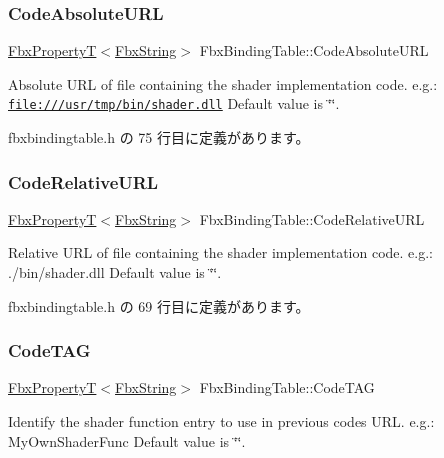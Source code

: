 \subsubsection{\texorpdfstring{Code\+Absolute\+U\+RL}{CodeAbsoluteURL}}
{\footnotesize\ttfamily \hyperlink{class_fbx_property_t}{Fbx\+PropertyT}$<$\hyperlink{class_fbx_string}{Fbx\+String}$>$ Fbx\+Binding\+Table\+::\+Code\+Absolute\+U\+RL}

Absolute U\+RL of file containing the shader implementation code. e.\+g.\+: \href{file:///usr/tmp/bin/shader.dll}{\tt file\+:///usr/tmp/bin/shader.\+dll} Default value is \char`\"{}\char`\"{}. 

 fbxbindingtable.\+h の 75 行目に定義があります。

\mbox{\label{class_fbx_binding_table_add10ea889f7b9e37ca0fbbf27dfc140f}} 
\subsubsection{\texorpdfstring{Code\+Relative\+U\+RL}{CodeRelativeURL}}
{\footnotesize\ttfamily \hyperlink{class_fbx_property_t}{Fbx\+PropertyT}$<$\hyperlink{class_fbx_string}{Fbx\+String}$>$ Fbx\+Binding\+Table\+::\+Code\+Relative\+U\+RL}

Relative U\+RL of file containing the shader implementation code. e.\+g.\+: ./bin/shader.dll Default value is \char`\"{}\char`\"{}. 

 fbxbindingtable.\+h の 69 行目に定義があります。

\mbox{\label{class_fbx_binding_table_ac1c73d117768ad0373d277a81e021fa3}} 
\subsubsection{\texorpdfstring{Code\+T\+AG}{CodeTAG}}
{\footnotesize\ttfamily \hyperlink{class_fbx_property_t}{Fbx\+PropertyT}$<$\hyperlink{class_fbx_string}{Fbx\+String}$>$ Fbx\+Binding\+Table\+::\+Code\+T\+AG}

Identify the shader function entry to use in previous code\textquotesingle{}s U\+RL. e.\+g.\+: My\+Own\+Shader\+Func Default value is \char`\"{}\char`\"{}. 

